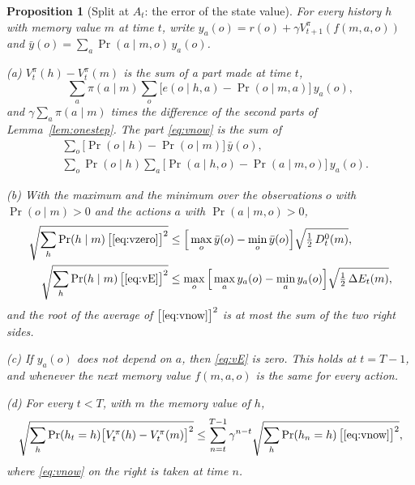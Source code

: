 \documentclass{article}
\newtheorem{proposition}{Proposition}[section]
\theoremstyle{definition}
\newcommand{\dE}{\Delta E}
\begin{document}
\begin{proposition}[Split at $A_t$: the error of the state value]\label{prop:vsplit}
For every history $h$ with memory value $m$ at time $t$, write $y_a(o)=r(o)+\gamma V^\pi_{t+1}(f(m,a,o))$ and $\bar y(o)=\sum_a\Pr(a\mid m,o)\,y_a(o)$.

(a) $V^\pi_t(h)-V^\pi_t(m)$ is the sum of a part made at time $t$,
\begin{equation}\label{eq:vnow}
\sum_a\pi(a\mid m)\sum_o\big[e(o\mid h,a)-\Pr(o\mid m,a)\big]\,y_a(o),
\end{equation}
and $\gamma\sum_a\pi(a\mid m)$ times the difference of the second parts of Lemma~\ref{lem:onestep}. The part \eqref{eq:vnow} is the sum of
\begin{align}
&\sum_o\big[\Pr(o\mid h)-\Pr(o\mid m)\big]\,\bar y(o), \label{eq:vzero}\\
&\sum_o\Pr(o\mid h)\sum_a\big[\Pr(a\mid h,o)-\Pr(a\mid m,o)\big]\,y_a(o). \label{eq:vE}
\end{align}

(b) With the maximum and the minimum over the observations $o$ with $\Pr(o\mid m)>0$ and the actions $a$ with $\Pr(a\mid m,o)>0$,
\begin{align*}
\sqrt{\sum_h\Pr(h\mid m)\,\big[\eqref{eq:vzero}\big]^2}&\le\Big[\max_o\bar y(o)-\min_o\bar y(o)\Big]\sqrt{\tfrac12\,D^0_t(m)},\\
\sqrt{\sum_h\Pr(h\mid m)\,\big[\eqref{eq:vE}\big]^2}&\le\max_o\Big[\max_ay_a(o)-\min_ay_a(o)\Big]\sqrt{\tfrac12\,\dE_t(m)},
\end{align*}
and the root of the average of $\big[\eqref{eq:vnow}\big]^2$ is at most the sum of the two right sides.

(c) If $y_a(o)$ does not depend on $a$, then \eqref{eq:vE} is zero. This holds at $t=T-1$, and whenever the next memory value $f(m,a,o)$ is the same for every action.

(d) For every $t<T$, with $m$ the memory value of $h$,
\[
\sqrt{\sum_h\Pr(h_t=h)\big[V^\pi_t(h)-V^\pi_t(m)\big]^2}\le\sum_{n=t}^{T-1}\gamma^{n-t}\sqrt{\sum_h\Pr(h_n=h)\,\big[\eqref{eq:vnow}\big]^2},
\]
where \eqref{eq:vnow} on the right is taken at time $n$.
\end{proposition}
\end{document}
